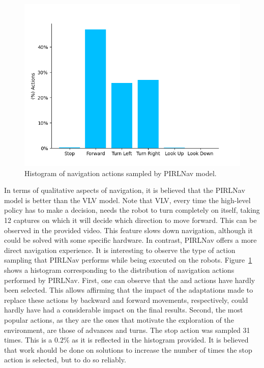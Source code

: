 \begin{figure}[t]
    \centering
    \includegraphics[width=\linewidth]{figures/ros4vsn/histograma_PIRLNav}
    \caption{Histogram of navigation actions sampled by PIRLNav model.}
    \label{fig:histrogram_pirlnav}
\end{figure}

In terms of qualitative aspects of navigation, it is believed that the PIRLNav model is better than the VLV model.
Note that VLV, every time the high-level policy has to make a decision, needs the robot to turn completely on itself, taking 12 captures on which it will decide which direction to move forward.
This can be observed in the provided video.
This feature slows down navigation, although it could be solved with some specific hardware.
In contrast, PIRLNav offers a more direct navigation experience.
It is interesting to observe the type of action sampling that PIRLNav performs while being executed on the robots.
Figure~\ref{fig:histrogram_pirlnav} shows a histogram corresponding to the distribution of navigation actions performed by PIRLNav.
First, one can observe that the \lookup and \lookdown actions have hardly been selected.
This allows affirming that the impact of the adaptations made to replace these actions by backward and forward movements, respectively, could hardly have had a considerable impact on the final results.
Second, the most popular actions, as they are the ones that motivate the exploration of the environment, are those of advances and turns.
The stop action was sampled 31 times.
This is a $0.2\%$ as it is reflected in the histogram provided.
It is believed that work should be done on solutions to increase the number of times the stop action is selected, but to do so reliably.

